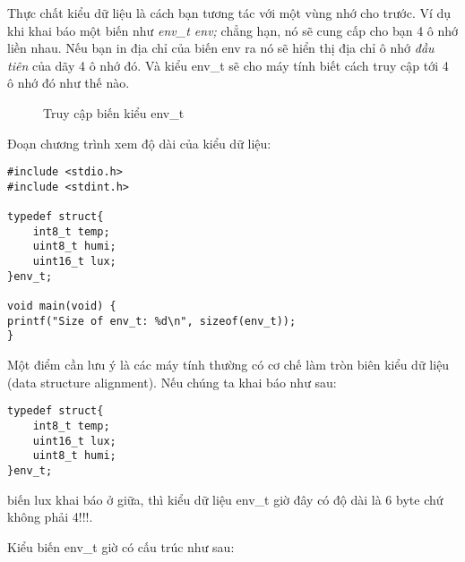 Thực chất kiểu dữ liệu là cách bạn tương tác với một vùng nhớ cho trước. Ví dụ khi khai báo một biến như \textit{env\_t env;} chẳng hạn, nó sẽ cung cấp cho bạn 4 ô nhớ liền nhau. Nếu bạn in địa chỉ của biến env ra nó sẽ hiển thị địa chỉ ô nhớ \textit{đầu tiên} của dãy 4 ô nhớ đó. Và kiểu env\_t sẽ cho máy tính biết cách truy cập tới 4 ô nhớ đó như thế nào.

\begin{figure}[h!]
\centering
{}
\caption{Truy cập biến kiểu env\_t} %
\end{figure}

Đoạn chương trình xem độ dài của kiểu dữ liệu:

\begin{lstlisting}
#include <stdio.h>
#include <stdint.h>

typedef struct{
    int8_t temp;
    uint8_t humi;
    uint16_t lux;
}env_t;

void main(void) {
printf("Size of env_t: %d\n", sizeof(env_t));
}
\end{lstlisting}

Một điểm cần lưu ý là các máy tính thường có cơ chế làm tròn biên kiểu dữ liệu (data structure alignment). Nếu chúng ta khai báo như sau:

\begin{lstlisting}
typedef struct{
    int8_t temp;
    uint16_t lux;
    uint8_t humi;
}env_t;
\end{lstlisting}

biến lux khai báo ở giữa, thì kiểu dữ liệu env\_t giờ đây có độ dài là 6 byte chứ không phải 4!!!.

Kiểu biến env\_t giờ có cấu trúc như sau:

